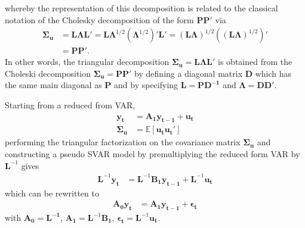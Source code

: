 \documentclass[a4paper,11pt,listof=nochaptergap,oneside,pointednumbers,bibtotoc,bigheadings,liststotoc]{scrbook}
\theoremstyle{mysatz}
\theoremstyle{mydefinition}
\theoremstyle{mytheorem}
\theoremstyle{mybemerkung}
\newcommand{\vect}[1]{\boldsymbol{\mathbf{#1}}}
\begin{document}
whereby the representation of this decomposition is related to the classical notation of the Cholesky decomposition of the form $\vect{PP'}$ via
\begin{equation} \label{eq:svar17}
\begin{split}
	\vect{\Sigma_u} & = \vect{L}\vect{\Lambda}\vect{L}' = \vect{L}\vect{\Lambda}^{1/2}(\vect{\Lambda}^{1/2})'\vect{L}' = (\vect{L}\vect{\Lambda})^{1/2}\left ( (\vect{L}\vect{\Lambda})^{1/2}\right )' \\
				& = \vect{P}\vect{P'}.
\end{split}								
\end{equation}
In other words, the triangular decomposition $\vect{\Sigma_u} = \vect{L}\vect{\Lambda}\vect{L'}$ is obtained from the Choleski decomposition $\vect{\Sigma_u} = \vect{P}\vect{P'}$ by defining a diagonal matrix $\vect{D}$ which has the same main diagonal as $\vect{P}$ and by specifying $\vect{L} = \vect{P}\vect{D^{-1}}$ and $\vect{\Lambda} = \vect{D}\vect{D'}$.

Starting from a reduced from VAR,
\begin{equation} \label{eq:svar18}
\begin{split}
	\vect{y_t} & = \vect{A_1}\vect{y_{t-1}} + \vect{u_t} \\
	\vect{\Sigma_u} & = \mathbb{E}[\vect{u_t}\vect{u_t}']
\end{split}								
\end{equation}
performing the triangular factorization on the covariance matrix $\vect{\Sigma_u}$ and constructing a pseudo SVAR model by premultiplying the reduced form VAR by $\vect{L}^{-1}$ gives
\begin{equation} \label{eq:svar19}
\begin{split}
	\vect{L}^{-1}\vect{y_t} & = \vect{L}^{-1}\vect{B_1}\vect{y_{t-1}} + \vect{L}^{-1}\vect{u_t}
\end{split}								
\end{equation}
which can be rewritten to
\begin{equation} \label{eq:svar21}
\begin{split}
	\vect{A_0}\vect{y_t} & = \vect{A_1}\vect{y_{t-1}} + \vect{\epsilon_t}
\end{split}								
\end{equation}
with $\vect{A_0} = \vect{L^{-1}}$, $\vect{A_1} = \vect{L}^{-1}\vect{B_1}$, $\vect{\epsilon_t} = \vect{L}^{-1}\vect{u_t}$.
\end{document}
